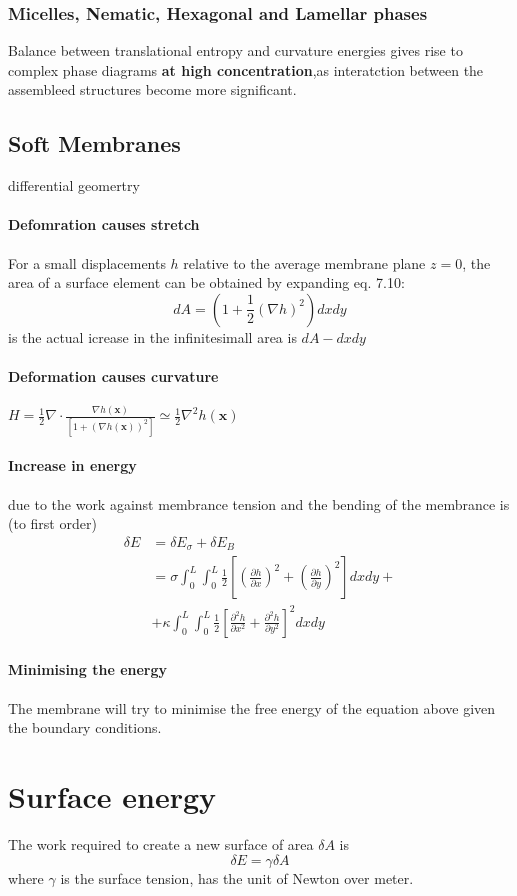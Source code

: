 \documentclass[12pt,a4paper]{article}
\begin{document}
\subsubsection{ Micelles, Nematic, Hexagonal and Lamellar phases}
Balance between translational entropy and curvature energies gives rise to complex phase diagrams \textbf{at high concentration},as interatction between the assembleed structures become more significant.
\subsection{ Soft Membranes}
differential geomertry
\paragraph*{Defomration causes stretch}
For a small displacements $h$ relative to the average membrane plane $z=0$, the area of a surface element can be obtained by expanding eq. 7.10:
$$
d A=\left(1+\frac{1}{2}(\nabla h)^2\right) d x d y
$$ is 
the actual icrease in the infinitesimall area is $d A-d x d y$
\paragraph*{Deformation causes curvature}
$H=\frac{1}{2} \nabla \cdot \frac{\nabla h(\mathbf{x})}{\left[1+(\nabla h(\mathbf{x}))^2\right]} \simeq \frac{1}{2} \nabla^2 h(\mathbf{x})$
\paragraph*{Increase in energy }due to the work against membrance tension and the bending of the membrance is (to first order)
$$\begin{aligned} \delta E & =\delta E_\sigma+\delta E_B \\ & =\sigma \int_0^L \int_0^L \frac{1}{2}\left[\left(\frac{\partial h}{\partial x}\right)^2+\left(\frac{\partial h}{\partial y}\right)^2\right] d x d y+ \\ & +\kappa \int_0^L \int_0^L \frac{1}{2}\left[\frac{\partial^2 h}{\partial x^2}+\frac{\partial^2 h}{\partial y^2}\right]^2 d x d y\end{aligned}$$
\paragraph*{Minimising the energy}
The membrane will try to minimise the free energy of the equation above given the boundary conditions.

\section{Surface energy}
The work required to create a new surface of area $\delta A$ is
$$
\delta E=\gamma \delta A
$$
where $\gamma$ is the surface tension, has the unit of Newton over meter.
\end{document}
